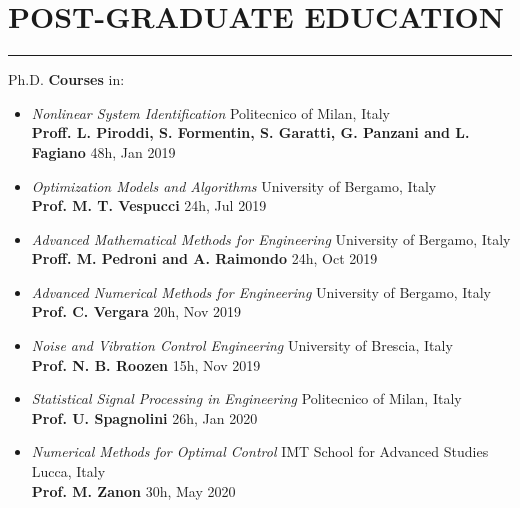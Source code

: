 \documentclass[10pt]{article}
\newcommand{\cvsection}[1]{\section*{\centering\normalsize\uppercase{#1}}\vspace{-16pt}\rule{\linewidth}{0.2pt}\vspace{6pt}}
\begin{document}
\cvsection{post-graduate education}
Ph.D. \textbf{Courses} in:
\begin{itemize}	
	\setlength\itemsep{-3pt}
	\renewcommand\labelitemi{$\vcenter{\hbox{\tiny$\bullet$}}$}

	\item \textit{Nonlinear System Identification} \hfill Politecnico of Milan, Italy\\
	\textbf{Proff. L. Piroddi, S. Formentin, S. Garatti, G. Panzani and L. Fagiano} \hfill 48h, Jan 2019\\
	
	\item \textit{Optimization Models and Algorithms} \hfill University of Bergamo, Italy\\
	\textbf{Prof. M. T. Vespucci} \hfill 24h, Jul 2019\\
	 
	\item \textit{Advanced Mathematical Methods for Engineering} \hfill University of Bergamo, Italy\\
	\textbf{Proff. M. Pedroni and A. Raimondo} \hfill 24h, Oct 2019\\
	 
	\item \textit{Advanced Numerical Methods for Engineering} \hfill University of Bergamo, Italy\\
	\textbf{Prof. C. Vergara} \hfill 20h, Nov 2019\\
	 
	\item \textit{Noise and Vibration Control Engineering} \hfill University of Brescia, Italy\\
	\textbf{Prof. N. B. Roozen} \hfill 15h, Nov 2019\\
	
	\item \textit{Statistical Signal Processing in Engineering} \hfill Politecnico of Milan, Italy\\
	\textbf{Prof. U. Spagnolini} \hfill 26h, Jan 2020\\
	 
	\item \textit{Numerical Methods for Optimal Control} \hfill IMT School for Advanced Studies Lucca, Italy\\
	\textbf{Prof. M. Zanon} \hfill 30h, May 2020\\
	

\end{itemize}
\end{document}
